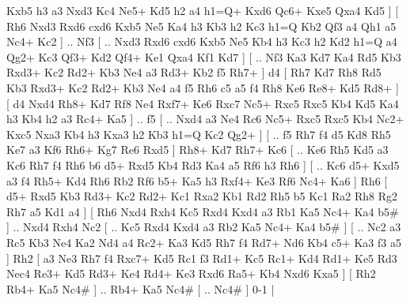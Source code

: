 Kxb5 h3  a3 Nxd3  Kc4 Ne5+  Kd5 h2  a4 h1=Q+  Kxd6 Qc6+  Kxe5 Qxa4  Kd5   ]  [  Rh6 Nxd3  Rxd6 cxd6  Kxb5 Ne5  Ka4 h3  Kb3 h2  Kc3 h1=Q  Kb2 Qf3  a4 Qh1  a5 Nc4+  Kc2   ] .. Nf3 [ .. Nxd3  Rxd6 cxd6  Kxb5 Ne5  Kb4 h3  Kc3 h2  Kd2 h1=Q  a4 Qg2+  Kc3 Qf3+  Kd2 Qf4+  Ke1 Qxa4  Kf1 Kd7   ]  [ .. Nf3  Ka3 Kd7  Ka4 Rd5  Kb3 Rxd3+  Kc2 Rd2+  Kb3 Ne4  a3 Rd3+  Kb2 f5  Rh7+   ]  d4 [  Rh7 Kd7  Rh8 Rd5  Kb3 Rxd3+  Kc2 Rd2+  Kb3 Ne4  a4 f5  Rh6 c5  a5 f4  Rh8 Ke6  Re8+ Kd5  Rd8+   ]  [  d4 Nxd4  Rh8+ Kd7  Rf8 Ne4  Rxf7+ Ke6  Rxc7 Nc5+  Rxc5 Rxc5  Kb4 Kd5  Ka4 h3  Kb4 h2  a3 Rc4+  Ka5   ] .. f5 [ .. Nxd4  a3 Ne4  Rc6 Nc5+  Rxc5 Rxc5  Kb4 Nc2+  Kxc5 Nxa3  Kb4 h3  Kxa3 h2  Kb3 h1=Q  Kc2 Qg2+   ]  [ .. f5  Rh7 f4  d5 Kd8  Rh5 Ke7  a3 Kf6  Rh6+ Kg7  Re6 Rxd5   ]  Rh8+   Kd7    Rh7+   Kc6 [ .. Ke6  Rh5 Kd5  a3 Kc6  Rh7 f4  Rh6 b6  d5+ Rxd5  Kb4 Rd3  Ka4 a5  Rf6 h3  Rh6   ]  [ .. Kc6  d5+ Kxd5  a3 f4  Rh5+ Kd4  Rh6 Rb2  Rf6 b5+  Ka5 h3  Rxf4+ Ke3  Rf6 Nc4+  Ka6   ]  Rh6 [  d5+ Rxd5  Kb3 Rd3+  Kc2 Rd2+  Kc1 Rxa2  Kb1 Rd2  Rh5 b5  Kc1 Ra2  Rh8 Rg2  Rh7 a5  Kd1 a4   ]  [  Rh6 Nxd4  Rxh4 Kc5  Rxd4 Kxd4  a3 Rb1  Ka5 Nc4+  Ka4 b5#   ] .. Nxd4    Rxh4   Nc2 [ .. Kc5  Rxd4 Kxd4  a3 Rb2  Ka5 Nc4+  Ka4 b5#   ]  [ .. Nc2  a3 Rc5  Kb3 Ne4  Ka2 Nd4  a4 Rc2+  Ka3 Kd5  Rh7 f4  Rd7+ Nd6  Kb4 c5+  Ka3 f3  a5   ]  Rh2 [  a3 Ne3  Rh7 f4  Rxc7+ Kd5  Rc1 f3  Rd1+ Kc5  Rc1+ Kd4  Rd1+ Ke5  Rd3 Nec4  Re3+ Kd5  Rd3+ Ke4  Rd4+ Ke3  Rxd6 Ra5+  Kb4 Nxd6  Kxa5   ]  [  Rh2 Rb4+  Ka5 Nc4#   ] .. Rb4+    Ka5  Nc4#    [ .. Nc4#   ] 0-1  |
